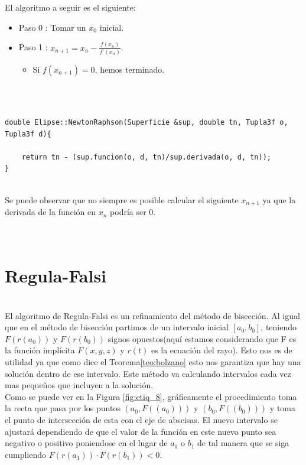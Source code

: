 El algoritmo a seguir es el siguiente:

\begin{itemize}
	\item Paso 0 : Tomar un $x_0$ inicial.
	\item Paso 1 : $x_{n+1} = x_n - \frac{f(x_n)}{f'(x_n)}$.
	\begin{itemize}
		\item Si $f(x_{n+1}) = 0$, hemos terminado.
	\end{itemize}
\end{itemize}
${ }$\\

\begin{lstlisting}[style=Consola]

double Elipse::NewtonRaphson(Superficie &sup, double tn, Tupla3f o, Tupla3f d){

	return tn - (sup.funcion(o, d, tn)/sup.derivada(o, d, tn));
}

\end{lstlisting}
${ }$\\



Se puede observar que no siempre es posible calcular el siguiente $x_{n+1}$ ya que la derivada de la función en $x_{n}$ podría ser $0$.
${ }$\\
${ }$\\

${ }$\\
\section{Regula-Falsi}
${ }$\\

El algoritmo de Regula-Falsi es un refinamiento del método de bisección. Al igual que en el método de bisección partimos de un intervalo inicial $[a_0, b_0]$, teniendo $F(r(a_0))$ y $F(r(b_0))$ signos opuestos(aquí estamos considerando que F es la función implícita $F(x,y,z)$ y $r(t)$ es la ecuación del rayo). Esto nos es de utilidad ya que como dice el Teorema\ref{teo:bolzano} esto nos garantiza que hay una solución dentro de ese intervalo. Este método va calculando intervalos cada vez mas pequeños que incluyen a la solución.
${ }$\\

Como se puede ver en la Figura \ref{fig:etiq_8}, gráficamente el procedimiento toma la recta que pasa por los puntos $(a_0, F((a_0)))$ y $(b_0, F((b_0)))$ y toma el punto de intersección de esta con el eje de abscisas. El nuevo intervalo se ajustará dependiendo de que el valor de la función en este nuevo punto sea negativo o positivo poniendose en el lugar de $a_1$ o $b_1$ de tal manera que se siga cumpliendo $F(r(a_1)) \cdot F(r(b_1)) < 0$.
${ }$\\

